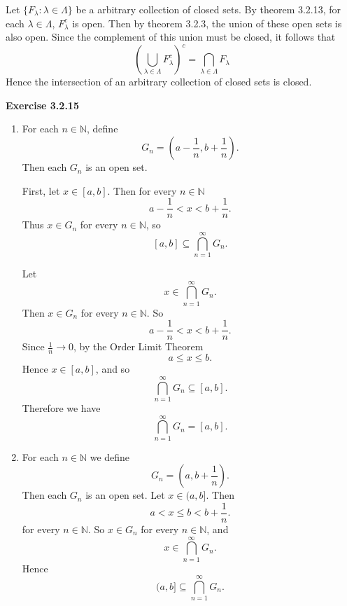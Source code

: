 \documentclass[12pt]{article}
\begin{document}
\begin{enumerate}[label=(\alph*)]
          Let \( \{F_{\lambda} : \lambda \in \Lambda\} \) be a arbitrary collection of closed sets.
          By theorem 3.2.13, for each \( \lambda \in \Lambda \), \( F_\lambda^c\) is open.
          Then by theorem 3.2.3, the union of these open sets is also open.
          Since the complement of this union must be closed, it follows that
          \[
              \left( \bigcup_{\lambda \in \Lambda } F_{\lambda}^c \right)^c = \bigcap_{\lambda \in \Lambda} F_{\lambda }
          \]
          Hence the intersection of an arbitrary collection of closed sets is closed.
\end{enumerate}

\textbf{Exercise 3.2.15}
\begin{enumerate}[label=(\alph*)]
    \item For each \( n \in \mathbb{N} \), define
          \[
              G_n = (a - \frac{1}{n}, b + \frac{1}{n}).
          \]
          Then each \( G_n \) is an open set.

          First, let \( x \in [a,b] \). Then for every \( n \in \mathbb{N} \)
          \[
              a - \frac{1}{n} < x < b + \frac{1}{n}.
          \]
          Thus \( x \in G_n \) for every \( n \in \mathbb{N} \), so
          \[
              [a,b] \subseteq \bigcap_{n=1}^{\infty} G_n.
          \]

          Let
          \[
              x \in \bigcap_{n=1}^{\infty} G_n.
          \]
          Then \( x \in G_n \) for every \( n \in \mathbb{N} \).
          So
          \[
              a - \frac{1}{n} < x < b + \frac{1}{n}.
          \]
          Since \( \frac{1}{n} \to 0 \), by the Order Limit Theorem
          \[
              a \leq x \leq b.
          \]
          Hence \( x \in [a,b] \), and so
          \[
              \bigcap_{n=1}^{\infty} G_n \subseteq [a,b].
          \]
          Therefore we have
          \[
              \bigcap_{n=1}^{\infty} G_n = [a,b].
          \]


    \item For each \( n \in \mathbb{N} \) we define
          \[
              G_n = (a, b + \frac{1}{n}).
          \]
          Then each \( G_n \) is an open set.
          Let \( x \in (a, b] \). Then
          \[
              a < x \leq b < b + \frac{1}{n}.
          \]
          for every \( n \in \mathbb{N} \).
          So \( x \in G_n \) for every \( n \in \mathbb{N} \), and
          \[
              x \in \bigcap_{n=1}^{\infty} G_n.
          \]
          Hence
          \[
              (a,b] \subseteq \bigcap_{n=1}^{\infty} G_n.
          \]


\end{enumerate}
\end{document}
